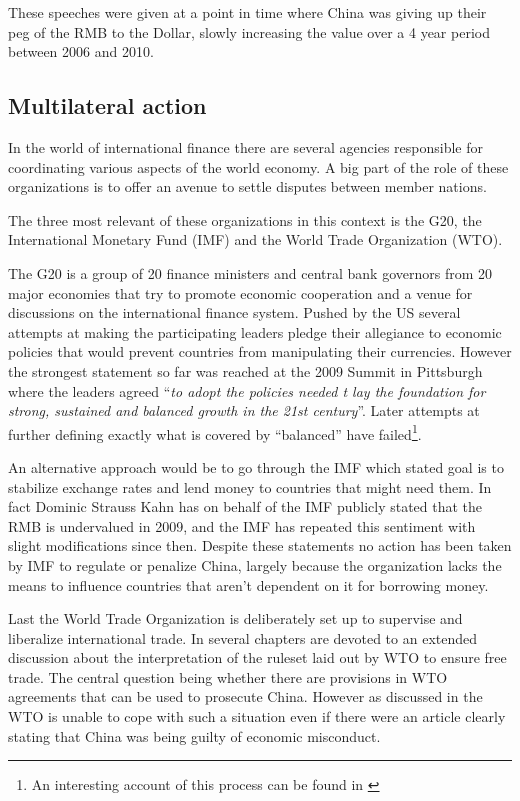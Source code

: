 These speeches were given at a point in time where China was giving up 
their peg of the RMB to the Dollar, slowly increasing the value over a 4 
year period between 2006 and 2010.

\subsection{Multilateral action}

In the world of international finance there are several agencies 
responsible for coordinating various aspects of the world economy. A big 
part of the role of these organizations is to offer an avenue to settle 
disputes between member nations. %

The three most relevant of these organizations in this context is the 
G20, the International Monetary Fund (IMF) and the World Trade 
Organization (WTO).

The G20 is a group of 20 finance ministers and central bank governors 
from 20 major economies that try to promote economic cooperation and a 
venue for discussions on the international finance system. Pushed by the 
US several attempts at making the participating leaders pledge their 
allegiance to economic policies that would prevent countries from 
manipulating their currencies. However the strongest statement so far 
was reached at the 2009 Summit in Pittsburgh where the leaders agreed 
``\textit{to adopt the policies needed t lay the foundation for strong, 
sustained and balanced growth in the 21st century}''. Later attempts at 
further defining exactly what is covered by ``balanced'' have 
failed\footnote{An interesting account of this process can be found in 
\cite{Levy11}}.

An alternative approach would be to go through the IMF which stated goal 
is to stabilize exchange rates and lend money to countries that might 
need them. In fact Dominic Strauss Kahn has on behalf of the IMF 
publicly stated that the RMB is undervalued in 2009, and the IMF has 
repeated this sentiment with slight modifications since 
then\cite{reuters09}.  Despite these statements no action has been taken 
by IMF to regulate or penalize China, largely because the organization 
lacks the means to influence countries that aren't dependent on it for 
borrowing money.

Last the World Trade Organization is deliberately set up to supervise 
and liberalize international trade. In \cite{Evenett10} several chapters 
are devoted to an extended discussion about the interpretation of the 
ruleset laid out by WTO to ensure free trade. The central question being 
whether there are provisions in WTO agreements that can be used to 
prosecute China.  However as discussed in \cite{Levy11} the WTO is 
unable to cope with such a situation even if there were an article 
clearly stating that China was being guilty of economic misconduct.

